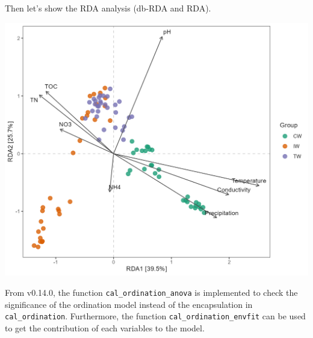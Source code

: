 \documentclass[
]{book}
\newenvironment{Shaded}{\begin{snugshade}}{\end{snugshade}}
\newcommand{\AttributeTok}[1]{\textcolor[rgb]{0.77,0.63,0.00}{#1}}
\newcommand{\CommentTok}[1]{\textcolor[rgb]{0.56,0.35,0.01}{\textit{#1}}}
\newcommand{\ConstantTok}[1]{\textcolor[rgb]{0.00,0.00,0.00}{#1}}
\newcommand{\FloatTok}[1]{\textcolor[rgb]{0.00,0.00,0.81}{#1}}
\newcommand{\FunctionTok}[1]{\textcolor[rgb]{0.00,0.00,0.00}{#1}}
\newcommand{\NormalTok}[1]{#1}
\newcommand{\SpecialCharTok}[1]{\textcolor[rgb]{0.00,0.00,0.00}{#1}}
\newcommand{\StringTok}[1]{\textcolor[rgb]{0.31,0.60,0.02}{#1}}
\begin{document}
Then let's show the RDA analysis (db-RDA and RDA).

\begin{Shaded}
\end{Shaded}

\begin{center}\includegraphics[width=650px]{Images/trans_env_rda_dbrda} \end{center}

From v0.14.0, the function \texttt{cal\_ordination\_anova} is implemented to check the significance of the ordination model instead of the encapsulation in \texttt{cal\_ordination}.
Furthermore, the function \texttt{cal\_ordination\_envfit} can be used to get the contribution of each variables to the model.
\end{document}
